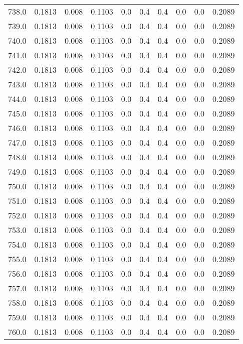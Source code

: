 \begin{longtable}{lrrrrrrrrr}
738.0 & 0.1813 & 0.008 & 0.1103 & 0.0 & 0.4 & 0.4 & 0.0 & 0.0 & 0.2089 \\
739.0 & 0.1813 & 0.008 & 0.1103 & 0.0 & 0.4 & 0.4 & 0.0 & 0.0 & 0.2089 \\
740.0 & 0.1813 & 0.008 & 0.1103 & 0.0 & 0.4 & 0.4 & 0.0 & 0.0 & 0.2089 \\
741.0 & 0.1813 & 0.008 & 0.1103 & 0.0 & 0.4 & 0.4 & 0.0 & 0.0 & 0.2089 \\
742.0 & 0.1813 & 0.008 & 0.1103 & 0.0 & 0.4 & 0.4 & 0.0 & 0.0 & 0.2089 \\
743.0 & 0.1813 & 0.008 & 0.1103 & 0.0 & 0.4 & 0.4 & 0.0 & 0.0 & 0.2089 \\
744.0 & 0.1813 & 0.008 & 0.1103 & 0.0 & 0.4 & 0.4 & 0.0 & 0.0 & 0.2089 \\
745.0 & 0.1813 & 0.008 & 0.1103 & 0.0 & 0.4 & 0.4 & 0.0 & 0.0 & 0.2089 \\
746.0 & 0.1813 & 0.008 & 0.1103 & 0.0 & 0.4 & 0.4 & 0.0 & 0.0 & 0.2089 \\
747.0 & 0.1813 & 0.008 & 0.1103 & 0.0 & 0.4 & 0.4 & 0.0 & 0.0 & 0.2089 \\
748.0 & 0.1813 & 0.008 & 0.1103 & 0.0 & 0.4 & 0.4 & 0.0 & 0.0 & 0.2089 \\
749.0 & 0.1813 & 0.008 & 0.1103 & 0.0 & 0.4 & 0.4 & 0.0 & 0.0 & 0.2089 \\
750.0 & 0.1813 & 0.008 & 0.1103 & 0.0 & 0.4 & 0.4 & 0.0 & 0.0 & 0.2089 \\
751.0 & 0.1813 & 0.008 & 0.1103 & 0.0 & 0.4 & 0.4 & 0.0 & 0.0 & 0.2089 \\
752.0 & 0.1813 & 0.008 & 0.1103 & 0.0 & 0.4 & 0.4 & 0.0 & 0.0 & 0.2089 \\
753.0 & 0.1813 & 0.008 & 0.1103 & 0.0 & 0.4 & 0.4 & 0.0 & 0.0 & 0.2089 \\
754.0 & 0.1813 & 0.008 & 0.1103 & 0.0 & 0.4 & 0.4 & 0.0 & 0.0 & 0.2089 \\
755.0 & 0.1813 & 0.008 & 0.1103 & 0.0 & 0.4 & 0.4 & 0.0 & 0.0 & 0.2089 \\
756.0 & 0.1813 & 0.008 & 0.1103 & 0.0 & 0.4 & 0.4 & 0.0 & 0.0 & 0.2089 \\
757.0 & 0.1813 & 0.008 & 0.1103 & 0.0 & 0.4 & 0.4 & 0.0 & 0.0 & 0.2089 \\
758.0 & 0.1813 & 0.008 & 0.1103 & 0.0 & 0.4 & 0.4 & 0.0 & 0.0 & 0.2089 \\
759.0 & 0.1813 & 0.008 & 0.1103 & 0.0 & 0.4 & 0.4 & 0.0 & 0.0 & 0.2089 \\
760.0 & 0.1813 & 0.008 & 0.1103 & 0.0 & 0.4 & 0.4 & 0.0 & 0.0 & 0.2089 \\

\end{longtable}

